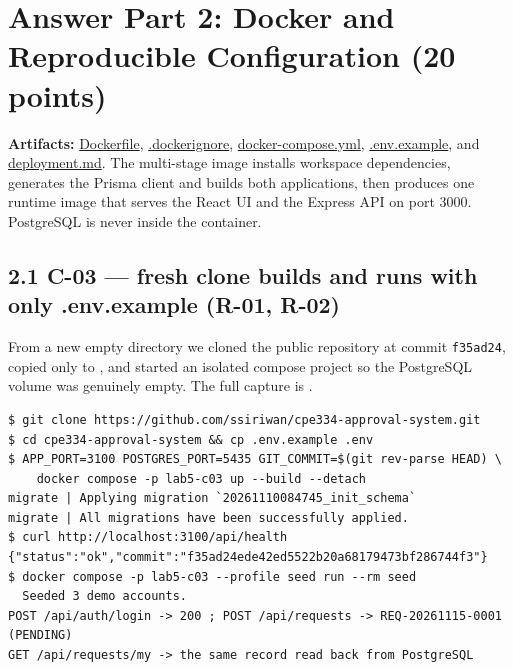 \documentclass[11pt,a4paper]{article}
\begin{document}

\section*{Answer Part 2: Docker and Reproducible Configuration (20 points)}
\label{part:2}

\textbf{Artifacts:}
\href{https://github.com/ssiriwan/cpe334-approval-system/blob/main/Dockerfile}{Dockerfile},
\href{https://github.com/ssiriwan/cpe334-approval-system/blob/main/.dockerignore}{.dockerignore},
\href{https://github.com/ssiriwan/cpe334-approval-system/blob/main/docker-compose.yml}{docker-compose.yml},
\href{https://github.com/ssiriwan/cpe334-approval-system/blob/main/.env.example}{.env.example}, and
\href{https://github.com/ssiriwan/cpe334-approval-system/blob/main/docs/labs/lab-05/deployment.md}{deployment.md}.
The multi-stage image installs workspace dependencies, generates the Prisma client and builds
both applications, then produces one runtime image that serves the React UI and the Express API
on port 3000. PostgreSQL is never inside the container.

\subsection*{2.1 C-03 --- fresh clone builds and runs with only .env.example (R-01, R-02)}
From a new empty directory we cloned the public repository at commit \texttt{f35ad24}, copied only
 to , and started an isolated compose project so the PostgreSQL
volume was genuinely empty. The full capture is
.

\begin{lstlisting}
$ git clone https://github.com/ssiriwan/cpe334-approval-system.git
$ cd cpe334-approval-system && cp .env.example .env
$ APP_PORT=3100 POSTGRES_PORT=5435 GIT_COMMIT=$(git rev-parse HEAD) \
    docker compose -p lab5-c03 up --build --detach
migrate | Applying migration `20261110084745_init_schema`
migrate | All migrations have been successfully applied.
$ curl http://localhost:3100/api/health
{"status":"ok","commit":"f35ad24ede42ed5522b20a68179473bf286744f3"}
$ docker compose -p lab5-c03 --profile seed run --rm seed
  Seeded 3 demo accounts.
POST /api/auth/login -> 200 ; POST /api/requests -> REQ-20261115-0001 (PENDING)
GET /api/requests/my -> the same record read back from PostgreSQL
\end{lstlisting}
\end{document}
